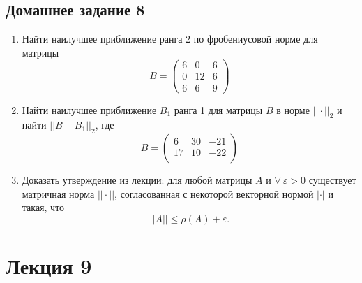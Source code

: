 \documentclass[12pt]{article}
\begin{document}
	\subsection{Домашнее задание 8}
	\begin{enumerate}
		\item
		Найти наилучшее приближение ранга 2 по фробениусовой норме для матрицы 
		\[B = \begin{pmatrix}
		6 & 0 & 6\\
		0 & 12 & 6\\
		6 & 6 & 9
		\end{pmatrix}\]
		
		\item Найти наилучшее приближение $B_1$ ранга 1 для матрицы $B$ в норме $||\cdot||_2$ и найти $||B-B_1||_2$, где
		\[B = \begin{pmatrix}
		6 & 30 & -21\\
		17 & 10 & -22\\
		\end{pmatrix}\]
		
		\item Доказать утверждение из лекции: для любой матрицы $A$ и $\forall~ \varepsilon>0$ существует матричная норма $||\cdot ||$, согласованная с некоторой векторной нормой $|\cdot|$ и такая, что $$||A||\leqslant \rho(A) + \varepsilon .$$
	\end{enumerate}
	
	
	\newpage
	\section{Лекция 9}
\end{document}
